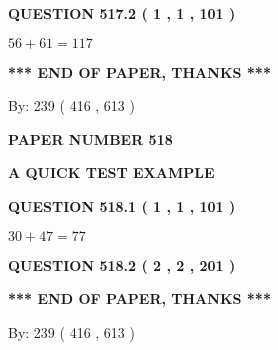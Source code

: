 \documentclass[12pt]{article}
\begin{document}
{\textbf{\Large{QUESTION
517.2 
 ( 1 , 1 , 101 )
}}}
  
  
 
 

$ %
56 +  %
61=   %
117$
 
 
   
   
 \vspace{0.2in}
 
   
   
   
   
\vspace{1.0in} 
{\textbf{\large{ *** END OF PAPER, THANKS *** }}} 
   
   
\hspace{1.0in} By: 
 239 ( 416 ,  613 )
   
   
   
   
\newpage 
\setcounter{page}{ 
   518001 } 
   
   
   
   
 {\textbf{ \Large{ PAPER NUMBER  518  }}}
   
   
\vspace{0.2in}
   
   
   
   
   
   
 \vspace{0.2in}
{\LARGE {\textbf{ A QUICK TEST EXAMPLE}}}
   
   
  
\vspace{0.2in}
  
{\textbf{\Large{QUESTION
518.1 
 ( 1 , 1 , 101 )
}}}
  
  
 
 

$ %
30 +  %
47=   %
77$
 
 
  
\vspace{0.2in}
  
{\textbf{\Large{QUESTION
518.2 
 ( 2 , 2 , 201 )
}}}
  
  
   
   
 \vspace{0.2in}
 
   
   
   
   
\vspace{1.0in} 
{\textbf{\large{ *** END OF PAPER, THANKS *** }}} 
   
   
\hspace{1.0in} By: 
 239 ( 416 ,  613 )
   
\end{document}
